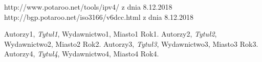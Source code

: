 \documentclass[polish,12pt,twoside,a4paper]{report}
\begin{document}




\newpage

\newpage

\newpage

\newpage

\begin{thebibliography}{6}

 http://www.potaroo.net/tools/ipv4/ z dnia 8.12.2018
 http://bgp.potaroo.net/iso3166/v6dcc.html z dnia 8.12.2018

Autorzy1, {\it Tytuł1}, Wydawnictwo1, Miasto1 Rok1.
Autorzy2, {\it Tytuł2}, Wydawnictwo2, Miasto2 Rok2.
Autorzy3, {\it Tytuł3}, Wydawnictwo3, Miasto3 Rok3.
Autorzy4, {\it Tytuł4}, Wydawnictwo4, Miasto4 Rok4.
\end{thebibliography}
\newpage


\end{document}
